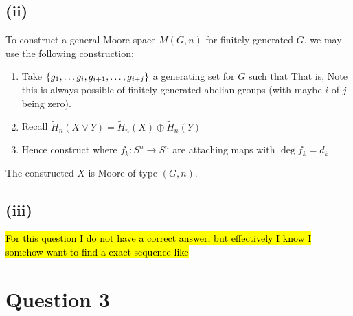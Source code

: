\documentclass{article}
\begin{document}
\subsection{(ii)}
To construct a general Moore space $M(G,n)$ for finitely generated $G$, we may use the following construction:
\begin{enumerate}
    \item Take $\left\{ g_1, \dots g_i, g_{i+1}, \dots, g_{i+j} \right\}$ a generating set for $G$ such that 
    That is,
    Note this is always possible of finitely generated abelian groups (with maybe $i$ of $j$ being zero).
    \item Recall $\tilde{H}_n(X \vee Y) = \tilde{H}_n(X) \oplus \tilde{H}_n(Y)$
    \item Hence construct 
    where $f_k:S^n \to S^n$ are attaching maps with $\deg f_k = d_k $
\end{enumerate}
The constructed $X$ is Moore of type $(G,n)$. 

\subsection{(iii)}

\hl{For this question I do not have a correct answer, but effectively I know I somehow want to find a exact sequence like}
\begin{center}
\end{center}

\section{Question 3}
\end{document}
